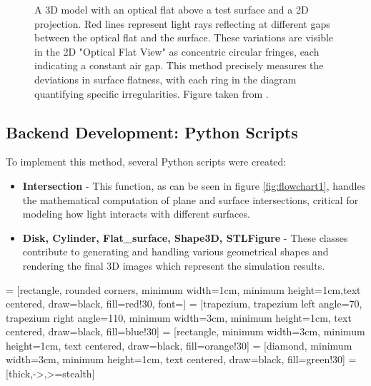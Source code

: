 \documentclass[../main.tex]{subfiles}
\begin{document}
\begin{figure}[H]
\begin{minipage}{0.49\textwidth}
        \caption{A 3D model with an optical flat above a test surface and a 2D projection. Red lines represent light rays reflecting at different gaps between the optical flat and the surface. These variations are visible in the 2D "Optical Flat View" as concentric circular fringes, each indicating a constant air gap. This method precisely measures the deviations in surface flatness, with each ring in the diagram quantifying specific irregularities. Figure taken from \cite{youtube}.}
        \label{fig:fringes}
    \end{minipage}
\end{figure}
\vspace{-35pt}
\subsection{Backend Development: Python Scripts}
\vspace{-10pt}
To implement this method, several Python scripts were created:
\vspace{-4pt}
\begin{itemize}
    \setlength{\itemsep}{0.1mm}
    \item \textbf{Intersection} - This function, as can be seen in figure \ref{fig:flowchart1}, handles the mathematical computation of plane and surface intersections, critical for modeling how light interacts with different surfaces.
    \item \textbf{Disk, Cylinder, Flat\_surface, Shape3D, STLFigure} - These classes contribute to generating and handling various geometrical shapes and rendering the final 3D images which represent the simulation results.
\end{itemize}

 = [rectangle, rounded corners, minimum width=1cm, minimum height=1cm,text centered, draw=black, fill=red!30, font=\scriptsize]
 = [trapezium, trapezium left angle=70, trapezium right angle=110, minimum width=3cm, minimum height=1cm, text centered, draw=black, fill=blue!30]
 = [rectangle, minimum width=3cm, minimum height=1cm, text centered, draw=black, fill=orange!30]
 = [diamond, minimum width=3cm, minimum height=1cm, text centered, draw=black, fill=green!30]
 = [thick,->,>=stealth]
\vspace{-8pt}
\end{document}
